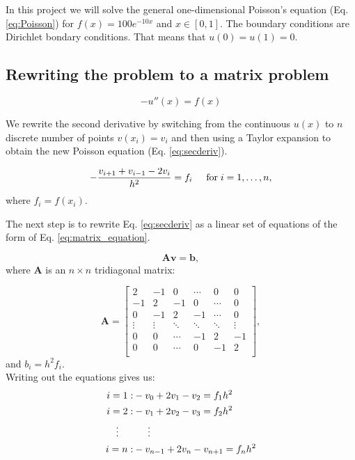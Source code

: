 In this project we will solve the general one-dimensional Poisson's equation (Eq. \ref{eq:Poisson}) for $f(x) = 100e^{-10x}$ and $x \in [0,1]$. The boundary conditions are Dirichlet bondary conditions. That means that $u(0) = u(1) = 0$.

\subsection{Rewriting the problem to a matrix problem}

\begin{equation}\label{eq:Poisson}
-u''(x) = f(x)
\end{equation}

We rewrite the second derivative by switching from the continuous $u(x)$ to $n$ discrete number of points $v(x_i) = v_i$ and then using a Taylor expansion to obtain the new Poisson equation (Eq. \ref{eq:secderiv}).

\begin{equation}\label{eq:secderiv}
-\frac{v_{i+1}+v_{i-1}-2v_i}{h^2} = f_i  \hspace{0.5cm} \mathrm{for} \hspace{0.1cm} i=1,\dots, n,
\end{equation}
where $f_i=f(x_i)$.

The next step is to rewrite Eq. \ref{eq:secderiv} as a linear set of equations of the form of Eq. \ref{eq:matrix_equation}.

\begin{equation}\label{eq:matrix_equation}
   \mathbf{A}\mathbf{v} = \mathbf{b},
\end{equation}
where $\mathbf{A}$ is an $n\times n$  tridiagonal matrix:

\[
    \mathbf{A} = \begin{bmatrix}
    	2& -1& 0 &\cdots & 0 &0 \\
        -1 & 2 & -1 &0 &\cdots &0 \\
        0&-1 &2 & -1 & \cdots & 0 \\
        \vdots& \vdots & \ddots &\ddots &\ddots & \vdots \\
        0&0 & \cdots &-1 &2& -1 \\
        0&0 & \cdots & 0  &-1 & 2 \\
        \end{bmatrix},
\]
and $b_i=h^2f_i$.\\

Writing out the equations gives us:
\begin{align*}
i = 1: &-v_0+2v_1-v_2 = f_1 h^2\\
i = 2: &-v_1+2v_2-v_3 = f_2 h^2\\
\vdots \indent &\indent \vdots\\
i = n: &-v_{n-1}+2v_n-v_{n+1} = f_n h^2\\
\end{align*}

